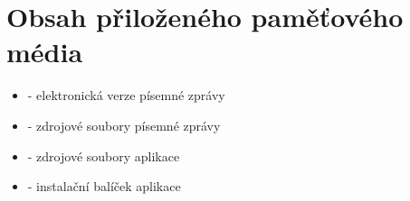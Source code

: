 
\chapter{Obsah přiloženého paměťového média}
    \begin{itemize}
        \item {} - elektronická verze písemné zprávy
        \item {} - zdrojové soubory písemné zprávy
        \item {} - zdrojové soubory aplikace
        \item {} - instalační balíček aplikace
    \end{itemize}



